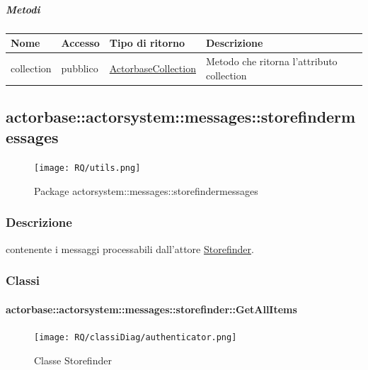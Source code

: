 \documentclass{scalatekids-article}
\begin{document}
\subparagraph{Metodi}
\begin{tabular}{| l | l | l | l |}
  \hline
  Nome & Accesso & Tipo di ritorno & Descrizione\\
  \hline
  collection & pubblico & \hyperref[sec:actorbase::actorsystem::utils::ActorbaseCollection]{ActorbaseCollection} & Metodo che ritorna l'attributo collection\\
  \hline
\end{tabular}


\subsection{actorbase::actorsystem::messages::storefindermessages}
\label{sec:actorbase::actorsystem::messages::storefindermessages}

\begin{figure}[H]
  \begin{center}
    \texttt{[image: RQ/utils.png]}
    \caption{Package actorsystem::messages::storefindermessages}
  \end{center}
\end{figure}

\subsubsection{Descrizione}
 contenente i messaggi processabili dall'attore \hyperref[sec:actorbase::actorsystem::actors::storefinder::Storefinder]{Storefinder}.

\subsubsection{Classi}

\paragraph{actorbase::actorsystem::messages::storefinder::GetAllItems}
\label{sec:actorbase::actorsystem::messages::storefinder::GetAllItems}

\begin{figure}[H]
  \begin{center}
    \texttt{[image: RQ/classiDiag/authenticator.png]}
    \caption{Classe Storefinder}
  \end{center}
\end{figure}
\end{document}
